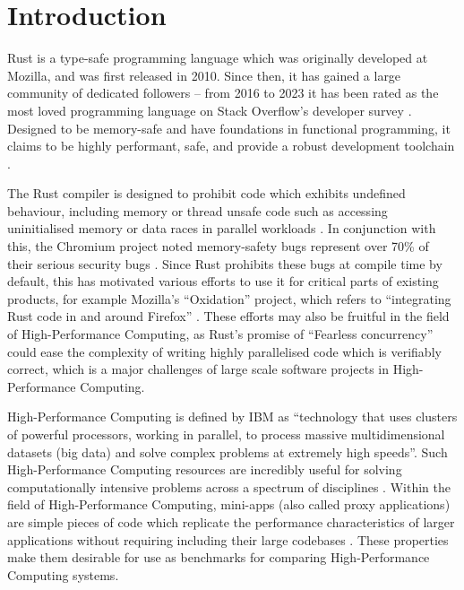 \chapter{Introduction}
\label{ch:introduction}

Rust is a type-safe programming language which was originally developed at Mozilla, and was first released in 2010. Since then, it has gained a large community of dedicated followers -- from 2016 to 2023 it has been rated as the most loved programming language on Stack Overflow's developer survey \cite{StackOverflowDeveloper}. Designed to be memory-safe and have foundations in functional programming, it claims to be highly performant, safe, and provide a robust development toolchain \cite{RustProgrammingLanguage}.

The Rust compiler is designed to prohibit code which exhibits undefined behaviour, including memory or thread unsafe code such as accessing uninitialised memory or data races in parallel workloads \cite{BehaviorConsideredUndefined}. In conjunction with this, the Chromium project noted memory-safety bugs represent over 70\% of their serious security bugs \cite{MemorySafety}. Since Rust prohibits these bugs at compile time by default, this has motivated various efforts to use it for critical parts of existing products, for example Mozilla's ``Oxidation'' project, which refers to ``integrating Rust code in and around Firefox'' \cite{OxidationMozillaWiki}. These efforts may also be fruitful in the field of High-Performance Computing, as Rust's promise of ``Fearless concurrency'' \cite{klabnikFearlessConcurrency2018} could ease the complexity of writing highly parallelised code which is verifiably correct, which is a major challenges of large scale software projects in High-Performance Computing.

High-Performance Computing is defined by IBM as ``technology that uses clusters of powerful processors, working in parallel, to process massive multidimensional datasets (big data) and solve complex problems at extremely high speeds''\cite{WhatHPCIntroduction}. Such High-Performance Computing resources are incredibly useful for solving computationally intensive problems across a spectrum of disciplines \cite{JournalDescriptionInternational}.
Within the field of High-Performance Computing, mini-apps (also called proxy applications) are simple pieces of code which replicate the performance characteristics of larger applications without requiring including their large codebases \cite{heroux2013mantevo}. These properties make them desirable for use as benchmarks for comparing High-Performance Computing systems.

